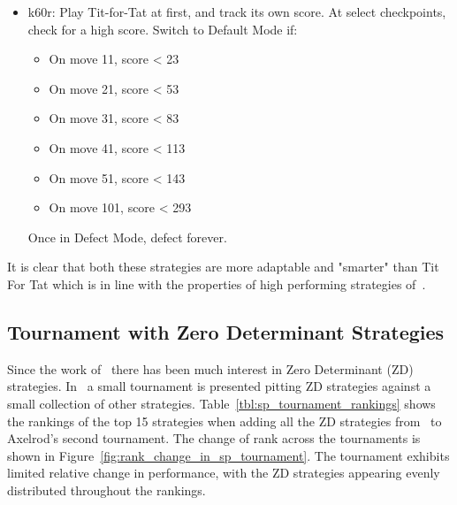 \documentclass{article}
\begin{document}
\begin{itemize}
    \item k60r: 
Play Tit-for-Tat at first, and track its own score.  At select checkpoints,
check for a high score.  Switch to Default Mode if:

        \begin{itemize}
            \item On move 11, score < 23
            \item On move 21, score < 53
            \item On move 31, score < 83
            \item On move 41, score < 113
            \item On move 51, score < 143
            \item On move 101, score < 293
        \end{itemize}

Once in Defect Mode, defect forever.
\end{itemize}

It is clear that both these strategies are more adaptable and "smarter" than Tit
For Tat which is in line with the properties of high performing strategies
of~\cite{glynatsi2024properties}.

\begin{table}[!hbtp]
        \centering
        \footnotesize
        
        \caption{Proportion of winners of the original tournament with 1, 2, 3
        or 4 new strategies}
        \label{tbl:alternate_extra_strategy_tournament_winner_proportion}
\end{table}



\subsection{Tournament with Zero Determinant Strategies}\label{sec:run_with_stewart_plotkin}

Since the work of~\cite{Press2012} there has been much interest in Zero
Determinant (ZD) strategies. In~\cite{Stewart2012} a small tournament is presented
pitting ZD strategies against a small collection of other strategies. Table~\ref{tbl:sp_tournament_rankings}
shows the rankings of the top 15 strategies when adding all the ZD
strategies from~\cite{Stewart2012} to Axelrod's second tournament. The change of rank across the
tournaments is shown in Figure~\ref{fig:rank_change_in_sp_tournament}. The tournament 
exhibits limited relative change in performance, with the ZD strategies 
appearing evenly distributed throughout the rankings.
\end{document}
